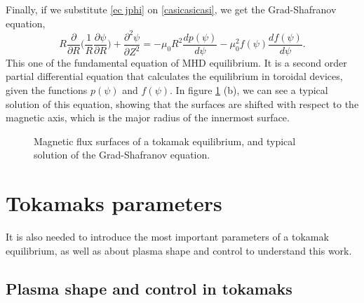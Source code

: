 \documentclass[a4paper,12pt,oneside]{book}
\newcommand{\p}{\partial}
\begin{document}
%
Finally, if we substitute \eqref{ec jphi} on \eqref{casicasicasi}, we get the Grad-Shafranov equation,
%
\begin{equation} \label{ec Grad Shaf}
R \dfrac{\p }{\p R} \Big( \dfrac{1}{R} \dfrac{\p \psi}{\p R} \Big) +\dfrac{\p^2 \psi}{\p Z^2}=-\mu_0 R^2 \dfrac{d p(\psi)}{d \psi} -\mu_0^2 f( \psi) \dfrac{d f(\psi)}{d \psi}.
\end{equation}
%
This one of the fundamental equation of MHD equilibrium. It is a second order partial differential equation that calculates the equilibrium in toroidal devices, given the functions $p(\psi)$ and $f(\psi)$. In figure \ref{nested and sol grad} (b), we can see a typical solution of this equation, showing that the surfaces are shifted with respect to the magnetic axis, which is the major radius of the innermost surface.

\begin{figure}
\centering
{}
\hspace{5cm}

\caption{Magnetic flux surfaces of a tokamak equilibrium, and typical solution of the Grad-Shafranov equation.}
\label{nested and sol grad}
\end{figure}





\section[Parameters]{Tokamaks parameters}
\label{sec Parameters}
It is also needed to introduce the most important parameters of a tokamak equilibrium, as well as about plasma shape and control to understand this work.

\subsection{Plasma shape and control in tokamaks}
\label{section_shape}
\end{document}
